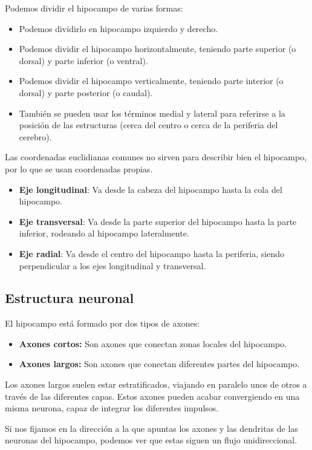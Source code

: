 \documentclass[12pt, letterpaper]{article}
\begin{document}
Podemos dividir el hipocampo de varias formas:
\begin{itemize}
    \item Podemos dividirlo en hipocampo izquierdo y derecho.
    \item Podemos dividir el hipocampo horizontalmente, teniendo parte superior (o dorsal) y parte inferior (o ventral).
    \item Podemos dividir el hipocampo verticalmente, teniendo parte interior (o dorsal) y parte posterior (o caudal).
    \item También se pueden usar los términos medial y lateral para referirse a la posición de las estructuras (cerca del centro o cerca de la periferia del cerebro).
\end{itemize}

Las coordenadas euclidianas comunes no sirven para describir bien el hipocampo, por lo que se usan coordenadas propias.
\begin{itemize}
    \item \textbf{Eje longitudinal}: Va desde la cabeza del hipocampo hasta la cola del hipocampo.
    \item \textbf{Eje transversal}: Va desde la parte superior del hipocampo hasta la parte inferior, rodeando al hipocampo lateralmente.
    \item \textbf{Eje radial}: Va desde el centro del hipocampo hasta la periferia, siendo perpendicular a los ejes longitudinal y transversal.
\end{itemize}

\subsection{Estructura neuronal}
El hipocampo está formado por dos tipos de axones:
\begin{itemize}
    \item \textbf{Axones cortos:} Son axones que conectan zonas locales del hipocampo.
    \item \textbf{Axones largos:} Son axones que conectan diferentes partes del hipocampo.
\end{itemize}

Los axones largos suelen estar estratificados, viajando en paralelo unos de otros a través de las diferentes capas. Estos axones pueden acabar convergiendo en una misma neurona, capaz de integrar los diferentes impulsos. 

Si nos fijamos en la dirección a la que apuntas los axones y las dendritas de las neuronas del hipocampo, podemos ver que estas siguen un flujo unidireccional.
\end{document}
